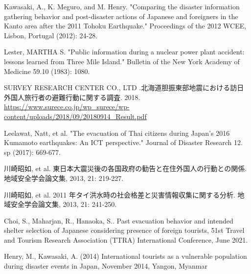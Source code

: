 \documentclass[letterpaper,12pt,titlepage,oneside,final,a4j,dvipdfmx]{book}
\begin{document}
\begin{thebibliography}{70}
 Kawasaki, A., K. Meguro, and M. Henry. "Comparing the disaster information gathering behavior and post-disaster actions of Japanese and foreigners in the Kanto area after the 2011 Tohoku Earthquake." Proceedings of the 2012 WCEE, Lisbon, Portugal (2012): 24-28.

 Lester, MARTHA S. "Public information during a nuclear power plant accident: lessons learned from Three Mile Island." Bulletin of the New York Academy of Medicine 59.10 (1983): 1080.


 SURVEY RESEARCH CENTER CO., LTD .北海道胆振東部地震における訪日外国人旅行者の避難行動に関する調査. 2018. \url{https://www.surece.co.jp/wp_surece/wp-content/uploads/2018/09/20180914_Result.pdf}


 Leelawat, Natt, et al. "The evacuation of Thai citizens during Japan's 2016 Kumamoto earthquakes: An ICT perspective." Journal of Disaster Research 12. sp (2017): 669-677.

 川崎昭如, et al. 東日本大震災後の各国政府の勧告と在住外国人の行動との関係. 地域安全学会論文集, 2013, 21: 219-227.

 川崎昭如, et al. 2011 年タイ洪水時の社会格差と災害情報収集に関する分析. 地域安全学会論文集, 2013, 21: 241-250.

 Choi, S., Maharjan, R., Hanaoka, S.. Past evacuation behavior and intended shelter selection of Japanese considering presence of foreign tourists, 51st Travel and Tourism Research Association (TTRA) International Conference, June 2021.

 Henry, M., Kawasaki, A. (2014) International tourists as a vulnerable population during disaster events in Japan, November 2014, Yangon, Myanmar

\end{thebibliography}
\end{document}
